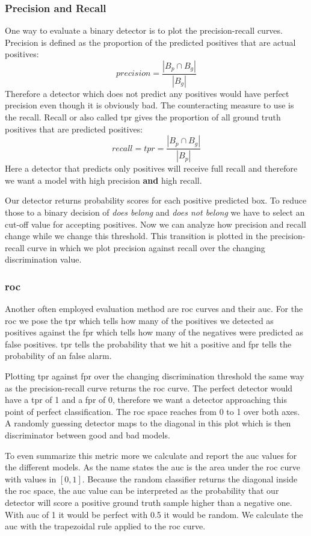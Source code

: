 \subsubsection{Precision and Recall}
One way to evaluate a binary detector is to plot the precision-recall curves. Precision is defined as the proportion of the predicted positives that are actual positives:
\begin{equation}
    \textit{precision} = \frac{|B_p \cap B_g|}{|B_g|}
\end{equation}
Therefore a detector which does not predict any positives would have perfect precision even though it is obviously bad. The counteracting measure to use is the recall. Recall or also called \gls{tpr} gives the proportion of all ground truth positives that are predicted positives:
\begin{equation}
    \textit{recall} = \textit{tpr} = \frac{|B_p \cap B_g|}{|B_p|}
\end{equation}
Here a detector that predicts only positives will receive full recall and therefore we want a model with high precision \textbf{and} high recall.

Our detector returns probability scores for each positive predicted box. To reduce those to a binary decision of \textit{does belong} and \textit{does not belong} we have to select an cut-off value for accepting positives. Now we can analyze how precision and recall change while we change this threshold. This transition is plotted in the precision-recall curve in which we plot precision against recall over the changing discrimination value.

\subsubsection{\gls{roc}}
Another often employed evaluation method are \gls{roc} curves and their \gls{auc}. For the \gls{roc} we pose the \gls{tpr} which tells how many of the positives we detected as positives against the \gls{fpr} which tells how many of the negatives were predicted as false positives. \gls{tpr} tells the probability that we hit a positive and \gls{fpr} tells the probability of an false alarm.

Plotting \gls{tpr} against \gls{fpr} over the changing discrimination threshold the same way as the precision-recall curve returns the \gls{roc} curve. The perfect detector would have a \gls{tpr} of 1 and a \gls{fpr} of 0, therefore we want a detector approaching this point of perfect classification. The \gls{roc} space reaches from 0 to 1 over both axes. A randomly guessing detector maps to the diagonal in this plot which is then discriminator between good and bad models.

To even summarize this metric more we calculate and report the \gls{auc} values for the different models. As the name states the \gls{auc} is the area under the \gls{roc} curve with values in $[0, 1]$. Because the random classifier returns the diagonal inside the \gls{roc} space, the \gls{auc} value can be interpreted as the probability that our detector will score a positive ground truth sample higher than a negative one. With \gls{auc} of 1 it would be perfect with 0.5 it would be random. We calculate the \gls{auc} with the trapezoidal rule applied to the \gls{roc} curve.
